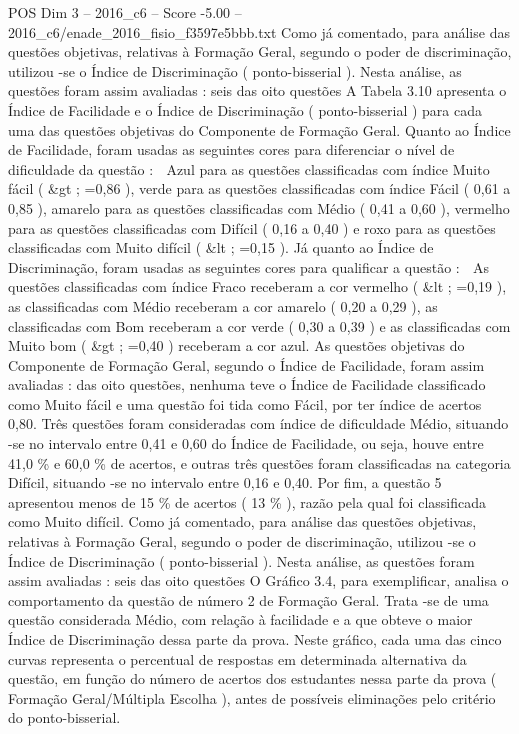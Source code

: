 \begin{textsample}{POS Dim 3 – 2016\_c6 – Score -5.00 – 2016\_c6/enade\_2016\_fisio\_f3597e5bbb.txt}
Como já comentado, para análise das questões objetivas, relativas à Formação Geral, segundo o poder de discriminação, utilizou -se o Índice de Discriminação ( ponto-bisserial ).
Nesta análise, as questões foram assim avaliadas : seis das oito questões A Tabela 3.10 apresenta o Índice de Facilidade e o Índice de Discriminação ( ponto-bisserial ) para cada uma das questões objetivas do Componente de Formação Geral.
Quanto ao Índice de Facilidade, foram usadas as seguintes cores para diferenciar o nível de dificuldade da questão :  Azul para as questões classificadas com índice Muito fácil ( \&gt ; =0,86 ), verde para as questões classificadas com índice Fácil ( 0,61 a 0,85 ), amarelo para as questões classificadas com Médio ( 0,41 a 0,60 ), vermelho para as questões classificadas com Difícil ( 0,16 a 0,40 ) e roxo para as questões classificadas com Muito difícil ( \&lt ; =0,15 ).
Já quanto ao Índice de Discriminação, foram usadas as seguintes cores para qualificar a questão :  As questões classificadas com índice Fraco receberam a cor vermelho ( \&lt ; =0,19 ), as classificadas com Médio receberam a cor amarelo ( 0,20 a 0,29 ), as classificadas com Bom receberam a cor verde ( 0,30 a 0,39 ) e as classificadas com Muito bom ( \&gt ; =0,40 ) receberam a cor azul.
As questões objetivas do Componente de Formação Geral, segundo o Índice de Facilidade, foram assim avaliadas : das oito questões, nenhuma teve o Índice de Facilidade classificado como Muito fácil e uma questão foi tida como Fácil, por ter índice de acertos 0,80.
Três questões foram consideradas com índice de dificuldade Médio, situando -se no intervalo entre 0,41 e 0,60 do Índice de Facilidade, ou seja, houve entre 41,0 \% e 60,0 \% de acertos, e outras três questões foram classificadas na categoria Difícil, situando -se no intervalo entre 0,16 e 0,40.
Por fim, a questão 5 apresentou menos de 15 \% de acertos ( 13 \% ), razão pela qual foi classificada como Muito difícil.
Como já comentado, para análise das questões objetivas, relativas à Formação Geral, segundo o poder de discriminação, utilizou -se o Índice de Discriminação ( ponto-bisserial ).
Nesta análise, as questões foram assim avaliadas : seis das oito questões O Gráfico 3.4, para exemplificar, analisa o comportamento da questão de número 2 de Formação Geral.
Trata -se de uma questão considerada Médio, com relação à facilidade e a que obteve o maior Índice de Discriminação dessa parte da prova.
Neste gráfico, cada uma das cinco curvas representa o percentual de respostas em determinada alternativa da questão, em função do número de acertos dos estudantes nessa parte da prova ( Formação Geral/Múltipla Escolha ), antes de possíveis eliminações pelo critério do ponto-bisserial.

\end{textsample}
